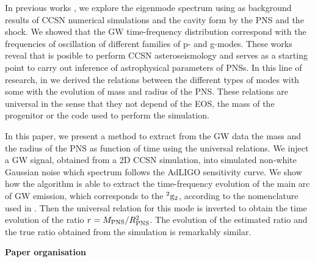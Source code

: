 In previous works \cite{Torres:2018, Torres:2019a}, we explore the eigenmode spectrum using as background results of CCSN numerical simulations and the cavity form by the PNS and the shock. We showed that the GW time-frequency distribution correspond with the frequencies of oscillation of different families of p- and g-modes. These works reveal that is posible to perform CCSN asteroseismology and serves as a starting point to carry out inference of astrophysical parameters of PNSs. In this line of research, in \cite{Torres:2019b} we derived the relations between the different types of modes with some with the evolution of mass and radius of the PNS. These relations are universal in the sense that they not depend of the EOS, the mass of the progenitor or the code used to perform the simulation. 

In this paper, we present a method to extract from the GW data the mass and the radius of the PNS as function of time using the universal relations. We inject a GW signal, obtained from a 2D CCSN simulation, into simulated non-white Gaussian noise which spectrum follows the AdLIGO sensitivity curve. We show how the algorithm is able to extract the time-frequency evolution of the main arc of GW emission, which corresponds to the $^2\rm{g}_2$, according to the nomenclature used in \cite{Torres:2019b}. Then the universal relation for this mode is inverted to obtain the time evolution of the ratio $r=M_{\rm PNS}/R_{\rm PNS}^2$. The evolution of the estimated ratio and the true ratio obtained from the simulation is remarkably similar.

\textbf{Paper organisation}\\

